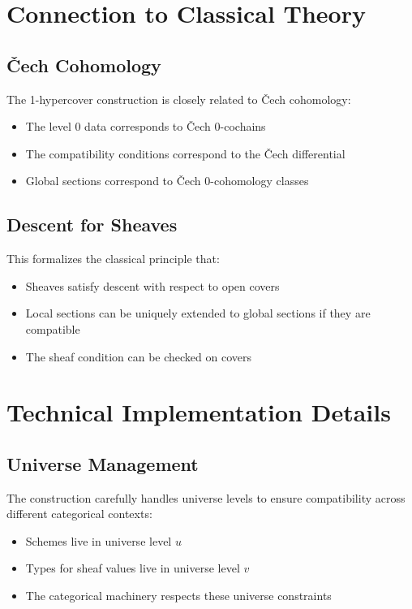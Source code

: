 \documentclass{article}
\theoremstyle{definition}
\begin{document}
\section{Connection to Classical Theory}

\subsection{Čech Cohomology}

The 1-hypercover construction is closely related to Čech cohomology:
\begin{itemize}
\item The level 0 data corresponds to Čech 0-cochains
\item The compatibility conditions correspond to the Čech differential
\item Global sections correspond to Čech 0-cohomology classes
\end{itemize}

\subsection{Descent for Sheaves}

This formalizes the classical principle that:
\begin{itemize}
\item Sheaves satisfy descent with respect to open covers
\item Local sections can be uniquely extended to global sections if they are compatible
\item The sheaf condition can be checked on covers
\end{itemize}

\section{Technical Implementation Details}

\subsection{Universe Management}

The construction carefully handles universe levels to ensure compatibility across different categorical contexts:
\begin{itemize}
\item Schemes live in universe level $u$
\item Types for sheaf values live in universe level $v$ 
\item The categorical machinery respects these universe constraints
\end{itemize}
\end{document}
